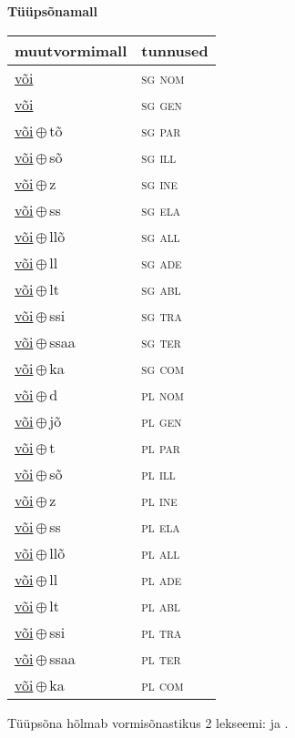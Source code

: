 

\vspace{3.5em}
\noindent \begin{minipage}{\textwidth}
\noindent \textbf{Tüüpsõnamall \,}\\

\begin{sideways}
\begin{tabular}{l l}
muutvormimall & tunnused \\
\hline
\underline{või} & \textsc{ sg nom } \\
\underline{või} & \textsc{ sg gen } \\
\underline{või}\,$\oplus$\,tõ & \textsc{ sg par } \\
\underline{või}\,$\oplus$\,sõ & \textsc{ sg ill } \\
\underline{või}\,$\oplus$\,z & \textsc{ sg ine } \\
\underline{või}\,$\oplus$\,ss & \textsc{ sg ela } \\
\underline{või}\,$\oplus$\,llõ & \textsc{ sg all } \\
\underline{või}\,$\oplus$\,ll & \textsc{ sg ade } \\
\underline{või}\,$\oplus$\,lt & \textsc{ sg abl } \\
\underline{või}\,$\oplus$\,ssi & \textsc{ sg tra } \\
\underline{või}\,$\oplus$\,ssaa & \textsc{ sg ter } \\
\underline{või}\,$\oplus$\,ka & \textsc{ sg com } \\
\underline{või}\,$\oplus$\,d & \textsc{ pl nom } \\
\underline{või}\,$\oplus$\,jõ & \textsc{ pl gen } \\
\underline{või}\,$\oplus$\,t & \textsc{ pl par } \\
\underline{või}\,$\oplus$\,sõ & \textsc{ pl ill } \\
\underline{või}\,$\oplus$\,z & \textsc{ pl ine } \\
\underline{või}\,$\oplus$\,ss & \textsc{ pl ela } \\
\underline{või}\,$\oplus$\,llõ & \textsc{ pl all } \\
\underline{või}\,$\oplus$\,ll & \textsc{ pl ade } \\
\underline{või}\,$\oplus$\,lt & \textsc{ pl abl } \\
\underline{või}\,$\oplus$\,ssi & \textsc{ pl tra } \\
\underline{või}\,$\oplus$\,ssaa & \textsc{ pl ter } \\
\underline{või}\,$\oplus$\,ka & \textsc{ pl com } \\
\end{tabular}
\end{sideways}
\label{tab:tüüpsõnamall-või}

\end{minipage}

 
\vspace{1em}
\noindent Tüüpsõna hõlmab vormisõnastikus 2 lekseemi:  ja .
